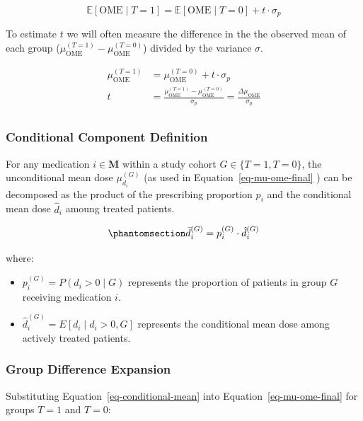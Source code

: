 \documentclass[
  letterpaper,
  DIV=11,
  numbers=noendperiod]{scrreprt}
\begin{document}
\[
\mathbb{E}[\text{OME} \mid T = 1] = \mathbb{E}[\text{OME} \mid T = 0] + t \cdot \sigma_{p}
\]

To estimate \(t\) we will often measure the difference in the the
observed mean of each group
(\(\mu_{\text{OME}}^{(T = 1)} - \mu_{\text{OME}}^{(T = 0)}\)) divided by
the variance \(\sigma\).

\[
\begin{align}
\mu_{\text{OME}}^{(T = 1)} &= \mu_{\text{OME}}^{(T = 0)} + t \cdot \sigma_{p} \\[1em]
 t &= \frac{\mu_{\text{OME}}^{(T = 1)} - \mu_{\text{OME}}^{(T = 0)} }{\sigma_p} = \frac{\Delta \mu_{\text{OME}}}{\sigma_p} \\
\end{align}
\]

\subsubsection{Conditional Component
Definition}\label{conditional-component-definition}

For any medication \(i \in \mathbf{M}\) within a study cohort
\(G \in \{T=1, T=0\}\), the unconditional mean dose \(\mu_{d_i}^{(G)}\)
(as used in Equation~\ref{eq-mu-ome-final} ) can be decomposed as the
product of the prescribing proportion \(p_i\) and the conditional mean
dose \(\hat{d}_i\) amoung treated patients.

\begin{equation}\phantomsection\label{eq-conditional-mean}{
\bar{d}_i^{(G)} = p_i^{(G)} \cdot \hat{d}_i^{(G)}
}\end{equation}

where:

\begin{itemize}
\item
  \(p_i^{(G)} = P(d_i > 0 \mid G)\) represents the proportion of
  patients in group \(G\) receiving medication \(i\).
\item
  \(\hat{d}_i^{(G)} = E[d_i \mid d_i > 0, G]\) represents the
  conditional mean dose among actively treated patients.
\end{itemize}

\subsubsection{Group Difference
Expansion}\label{group-difference-expansion}

Substituting Equation~\ref{eq-conditional-mean} into
Equation~\ref{eq-mu-ome-final} for groups \(T=1\) and \(T=0\):
\end{document}

